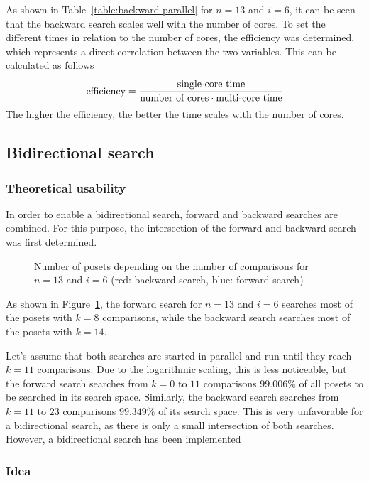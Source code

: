 \documentclass[10pt,journal,compsoc]{IEEEtran}
\begin{document}
As shown in Table~\ref{table:backward-parallel} for $n = 13$ and $i = 6$, it can be seen that the backward search scales well with the number of cores.
To set the different times in relation to the number of cores, the efficiency was determined, which represents a direct correlation between the two variables.
This can be calculated as follows
\[
  \text{efficiency} = \cfrac{\text{single-core time}}{\text{number of cores} \cdot \text{multi-core time}}
\]
The higher the efficiency, the better the time scales with the number of cores.


\subsection{Bidirectional search} \label{sec:bidirectional}

\subsubsection{Theoretical usability}

In order to enable a bidirectional search, forward and backward searches are combined.
For this purpose, the intersection of the forward and backward search was first determined.

\begin{figure}
  
  \centering
  \caption{Number of posets depending on the number of comparisons for $n = 13$ and $i = 6$ (red: backward search, blue: forward search)}
  \label{fig:backward_forward_count_13_6}
\end{figure}

As shown in Figure~\ref{fig:backward_forward_count_13_6}, the forward search for $n = 13$ and $i = 6$ searches most of the posets with $k = 8$ comparisons, while the backward search searches most of the posets with $k = 14$.

Let's assume that both searches are started in parallel and run until they reach $k = 11$ comparisons.
Due to the logarithmic scaling, this is less noticeable, but the forward search searches from $k = 0$ to $11$ comparisons $99.006\%$ of all posets to be searched in its search space.
Similarly, the backward search searches from $k = 11$ to $23$ comparisons $99.349\%$ of its search space.
This is very unfavorable for a bidirectional search, as there is only a small intersection of both searches.
However, a bidirectional search has been implemented

\subsubsection{Idea}
\end{document}
